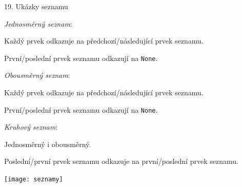 \documentclass[czech]{beamer}
\begin{document}
\begin{frame}{19. Ukázky seznamu}

\begin{multicols}{2}

\emph{Jednosměrný seznam}: 

Každý prvek odkazuje na předchozí/následující prvek seznamu. 

První/poslední prvek seznamu odkazují na \texttt{None}.{\scriptsize\bigskip{}
}{\scriptsize\par}

\emph{Obousměrný seznam}: 

Každý prvek odkazuje na předchozí/následující prvek seznamu. 

První/poslední prvek seznamu odkazují na \texttt{None}.{\scriptsize\bigskip{}
}{\scriptsize\par}

\emph{Kruhový seznam}: 

Jednosměrný i obousměrný. 

Poslední/první prvek seznamu odkazuje na první/poslední prvek seznamu.
\begin{center}
\texttt{[image: seznamy]}
\par\end{center}

\end{multicols}
\end{frame}
\end{document}
